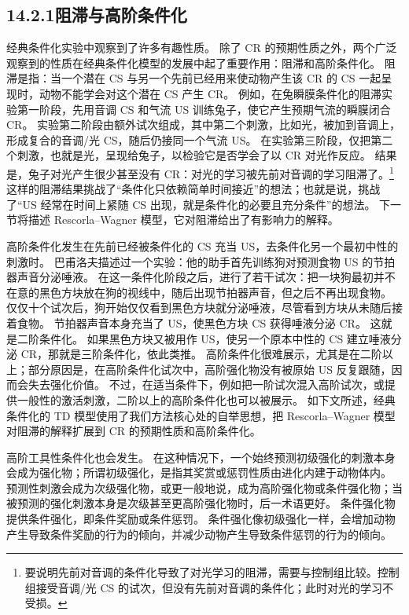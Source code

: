 \documentclass[UTF8,12pt,a4paper,fontset=fandol]{ctexart}
\begin{document}
\subsection*{14.2.1\quad 阻滞与高阶条件化}

经典条件化实验中观察到了许多有趣性质。
除了 CR 的预期性质之外，两个广泛观察到的性质在经典条件化模型的发展中起了重要作用：阻滞和高阶条件化。
阻滞是指：当一个潜在 CS 与另一个先前已经用来使动物产生该 CR 的 CS 一起呈现时，动物不能学会对这个潜在 CS 产生 CR。
例如，在兔瞬膜条件化的阻滞实验第一阶段，先用音调 CS 和气流 US 训练兔子，使它产生预期气流的瞬膜闭合 CR。
实验第二阶段由额外试次组成，其中第二个刺激，比如光，被加到音调上，形成复合的音调/光 CS，随后仍接同一个气流 US。
在实验第三阶段，仅把第二个刺激，也就是光，呈现给兔子，以检验它是否学会了以 CR 对光作反应。
结果是，兔子对光产生很少甚至没有 CR：对光的学习被先前对音调的学习阻滞了。\footnote{要说明先前对音调的条件化导致了对光学习的阻滞，需要与控制组比较。控制组接受音调/光 CS 的试次，但没有先前对音调的条件化；此时对光的学习不受损。}
这样的阻滞结果挑战了“条件化只依赖简单时间接近”的想法；也就是说，挑战了“US 经常在时间上紧随 CS 出现，就是条件化的必要且充分条件”的想法。
下一节将描述 Rescorla--Wagner 模型，它对阻滞给出了有影响力的解释。

高阶条件化发生在先前已经被条件化的 CS 充当 US，去条件化另一个最初中性的刺激时。
巴甫洛夫描述过一个实验：他的助手首先训练狗对预测食物 US 的节拍器声音分泌唾液。
在这一条件化阶段之后，进行了若干试次：把一块狗最初并不在意的黑色方块放在狗的视线中，随后出现节拍器声音，但之后不再出现食物。
仅仅十个试次后，狗开始仅仅看到黑色方块就分泌唾液，尽管看到方块从未随后接着食物。
节拍器声音本身充当了 US，使黑色方块 CS 获得唾液分泌 CR。
这就是二阶条件化。
如果黑色方块又被用作 US，使另一个原本中性的 CS 建立唾液分泌 CR，那就是三阶条件化，依此类推。
高阶条件化很难展示，尤其是在二阶以上；部分原因是，在高阶条件化试次中，高阶强化物没有被原始 US 反复跟随，因而会失去强化价值。
不过，在适当条件下，例如把一阶试次混入高阶试次，或提供一般性的激活刺激，二阶以上的高阶条件化也可以被展示。
如下文所述，经典条件化的 TD 模型使用了我们方法核心处的自举思想，把 Rescorla--Wagner 模型对阻滞的解释扩展到 CR 的预期性质和高阶条件化。

高阶工具性条件化也会发生。
在这种情况下，一个始终预测初级强化的刺激本身会成为强化物；所谓初级强化，是指其奖赏或惩罚性质由进化内建于动物体内。
预测性刺激会成为次级强化物，或更一般地说，成为高阶强化物或条件强化物；当被预测的强化刺激本身是次级甚至更高阶强化物时，后一术语更好。
条件强化物提供条件强化，即条件奖励或条件惩罚。
条件强化像初级强化一样，会增加动物产生导致条件奖励的行为的倾向，并减少动物产生导致条件惩罚的行为的倾向。
\end{document}
